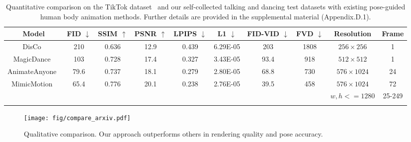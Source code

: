 \begin{table*}[htp!]
\centering\small

\begin{tabular}{c|ccccc|cc|cc}
\Xhline{1pt}
\textbf{Model} & \textbf{FID}  $\downarrow$   & \textbf{SSIM}   $\uparrow$ & \textbf{PSNR}   $\uparrow$  & \textbf{LPIPS}  $\downarrow$  & \textbf{L1}    $\downarrow$  & \textbf{FID-VID}  $\downarrow$  & \textbf{FVD}  $\downarrow$     & \textbf{Resolution} & \textbf{Frame} \\ \hline
DisCo~\cite{wang2024disco}       & 210 & 0.636              &  12.9& 0.439             & 6.29E-05     & 203      & 1808              & $256\times256$ & 1  \\ 
MagicDance~\cite{chang2023magicdance}          & 103 & 0.728              & 17.4& 0.327              &  3.43E-05  & 93.4         & 918   & $512\times512$ & 1 \\ 
AnimateAnyone~\cite{hu2024animate}         & 79.6&  0.737    &  18.1& 0.279              & 2.80E-05        & 68.8   & 730   & $576\times1024$ & 24 \\ 
MimicMotion~\cite{zhang2024mimicmotion}            & 65.4&  0.776              & 20.1& 0.238              &  2.76E-05  & 39.5         & 458   & $576\times1024$ & 72 \\ 
\cellcolor[HTML]{D9D9D9}{Ours}           & \cellcolor[HTML]{D9D9D9}{49.4} & \cellcolor[HTML]{D9D9D9}{0.838}             & \cellcolor[HTML]{D9D9D9}{22.8}  & \cellcolor[HTML]{D9D9D9}{0.186}           & \cellcolor[HTML]{D9D9D9}{1.73E-05}  & \cellcolor[HTML]{D9D9D9}{25.5}         & \cellcolor[HTML]{D9D9D9}{320}   & \cellcolor[HTML]{D9D9D9}$w,h<=1280$ & \cellcolor[HTML]{D9D9D9}25-249 \\ \Xhline{1pt}
\end{tabular}
\vspace{-0.1in}
\caption{Quantitative comparison on the TikTok dataset~\cite{jafarian2021learning} and our self-collected talking and dancing test datasets with existing pose-guided human body animation methods. Further details are provided in the supplemental material (Appendix.D.1).}
\label{tab:metrics}
\vspace{-0.1in}
\end{table*}

\begin{figure*}
    \centering
    \texttt{[image: fig/compare\_arxiv.pdf]}
    \vspace{-0.25in}
    \caption{Qualitative comparison. Our approach outperforms others in rendering quality and pose accuracy. }
    \vspace{-0.2in}
    \label{fig:tiktok}
\end{figure*}

